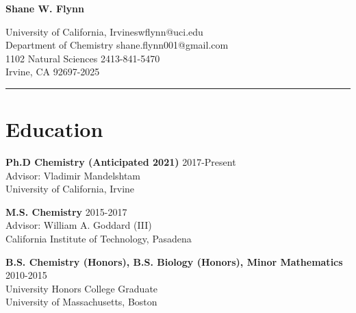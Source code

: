 \documentclass[letterpaper]{article}
\def\name{Shane W. Flynn}
\renewenvironment{itemize}{
  \begin{list}{}{
    \setlength{\leftmargin}{1.5em}
  }
}{
  \end{list}
}
\begin{document}
\centerline{\huge \textbf{\name}}
\vspace{0.2in}
University of California, Irvine\hfill swflynn@uci.edu\\
Department of Chemistry \hfill shane.flynn001@gmail.com\\
1102 Natural Sciences 2\hfill 413-841-5470\\
Irvine, CA 92697-2025\\



\vspace{0.2in}
\hrule

\section*{Education}

\begin{itemize}
    \item \textbf{Ph.D  Chemistry (Anticipated 2021)}  \hfill 2017-Present\\
      Advisor: Vladimir Mandelshtam\\
      University of California, Irvine

\item \textbf{M.S. Chemistry}  \hfill 2015-2017\\
      Advisor: William A. Goddard (III)\\
      California Institute of Technology, Pasadena

\item \textbf{B.S. Chemistry (Honors), B.S. Biology (Honors), Minor Mathematics}
      \hfill 2010-2015\\
      University Honors College Graduate\\
      University of Massachusetts, Boston
\end{itemize}
\end{document}
